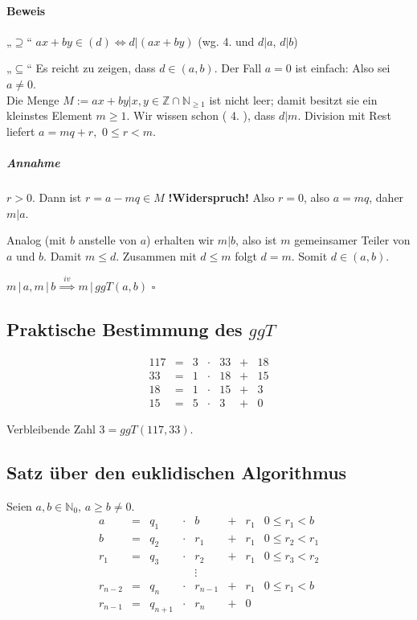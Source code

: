 \documentclass[14pt,a4paper]{article}
\newcommand{\N}{\ensuremath{\mathbb{N}}}
\newcommand{\Z}{\ensuremath{\mathbb{Z}}}
\newcommand{\Nzero}{\ensuremath{\N_0}}
\begin{document}
			\paragraph{Beweis}
				\par
				„$\supseteq$“
				$ ax + by \in (d) \Leftrightarrow d|(ax + by) $ (wg. 4. und $d|a$, $d|b$)
				\par
				„$\subseteq$“
				Es reicht zu zeigen, dass $ d \in (a,b) $.
				Der Fall $ a=0 $ ist einfach: Also sei $a \neq 0$. \\
				Die Menge $ M := {ax + by | x,y \in \Z} \cap \N_{\ge 1} $ ist nicht leer; damit besitzt sie ein kleinstes Element $m \ge 1$.
				Wir wissen schon ( 4. ), dass $d|m$.
				Division mit Rest liefert $ a = mq + r,\,\, 0 \le r < m $.

				\subparagraph{Annahme}
					$r > 0$. Dann ist $ r = a - mq \in M$ \textbf{!\;Widerspruch\;!} Also $ r = 0$, also $a = mq$, daher $m|a$.

					Analog (mit $b$ anstelle von $a$) erhalten wir $m | b$, also ist $m$ gemeinsamer Teiler von $a$ und $b$.
					Damit $m \le d$. Zusammen mit $ d \le m $ folgt $ d = m $.
					Somit $ d \in (a,b) $.

					$m\,|\,a, m\,|\,b \stackrel{iv}{\implies} m\,|\,ggT(a,b) $
					$\square$

		\subsection{Praktische Bestimmung des $ggT$}
			\[
				\begin{matrix}
					117 & = & 3 & \cdot & 33 & + & 18 \\
					 33 & = & 1 & \cdot & 18 & + & 15 \\
					 18 & = & 1 & \cdot & 15 & + &  3 \\
					 15 & = & 5 & \cdot &  3 & + &  0
				\end{matrix}
			\]

			Verbleibende Zahl $ 3 = ggT(117, 33) $.
		\subsection{Satz über den euklidischen Algorithmus}
			Seien $a,b \in \Nzero,\, a \ge b \ne 0 $.\\
			\[
				\begin{matrix}
					a       & = & q_1     & \cdot & b       & + & r_1 & 0 \le r_1 < b   \\
					b       & = & q_2     & \cdot & r_1     & + & r_1 & 0 \le r_2 < r_1 \\
					r_1     & = & q_3     & \cdot & r_2     & + & r_1 & 0 \le r_3 < r_2 \\
					        &   &         &       & \vdots  &   &     &                 \\
					r_{n-2} & = & q_n     & \cdot & r_{n-1} & + & r_1 & 0 \le r_1 < b   \\
					r_{n-1} & = & q_{n+1} & \cdot & r_n     & + & 0   &
				\end{matrix}
			\]
\end{document}
